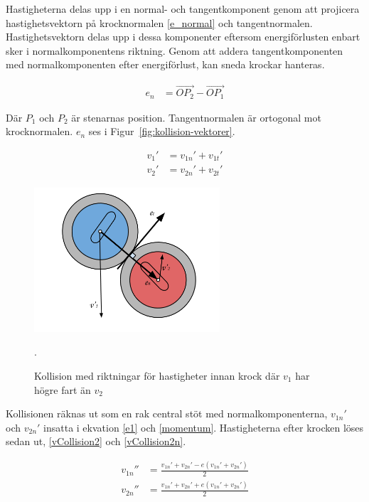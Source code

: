 \documentclass[11pt]{article} %
\begin{document}
\pagebreak

Hastigheterna delas upp i en normal- och tangentkomponent genom att projicera hastighetsvektorn på krocknormalen \eqref{e_normal} och tangentnormalen. Hastighetsvektorn delas upp i dessa komponenter eftersom energiförlusten enbart sker i normalkomponentens riktning. Genom att addera tangentkomponenten med normalkomponenten efter energiförlust, kan sneda krockar hanteras.

 \begin{align}\label{e_normal}
e_n& = \overrightarrow{OP_2} -  \overrightarrow{OP_1}  
 \end{align}

Där $P_1$ och $P_2$ är stenarnas position. Tangentnormalen är ortogonal mot krocknormalen. $e_n$ ses i Figur~\ref{fig:kollision-vektorer}. 

 \begin{align}\label{vCollision}
v_1'& = v_{1n}' + v_{1t}'\\
v_2'& = v_{2n}' + v_{2t}'
 \end{align}

\begin{figure}[ht!]
\centering
\includegraphics[width=69mm]{kollision-vektorer.png}
\caption{Kollision med riktningar för hastigheter innan krock där $v_{1}$ har högre fart än $v_{2}$}.
\label{fig:kollision-vektorer}
\label{overflow}
\end{figure}

Kollisionen räknas ut som en rak central stöt med normalkomponenterna, $v_{1n}'$ och  $v_{2n}'$ insatta i ekvation \eqref{e1} och \eqref{momentum}. Hastigheterna efter krocken löses sedan ut, \eqref{vCollision2} och \eqref{vCollision2n}.

 \begin{align}\label{vCollision2}
 v_{1n}''& = \frac{v_{1n}' + v_{2n}'  - e(v_{1n}' + v_{2n}')}{2} \\
 v_{2n}''& = \frac{v_{1n}' + v_{2n}'  + e(v_{1n}' + v_{2n}')}{2} \label{vCollision2n}
 \end{align}
\end{document}
